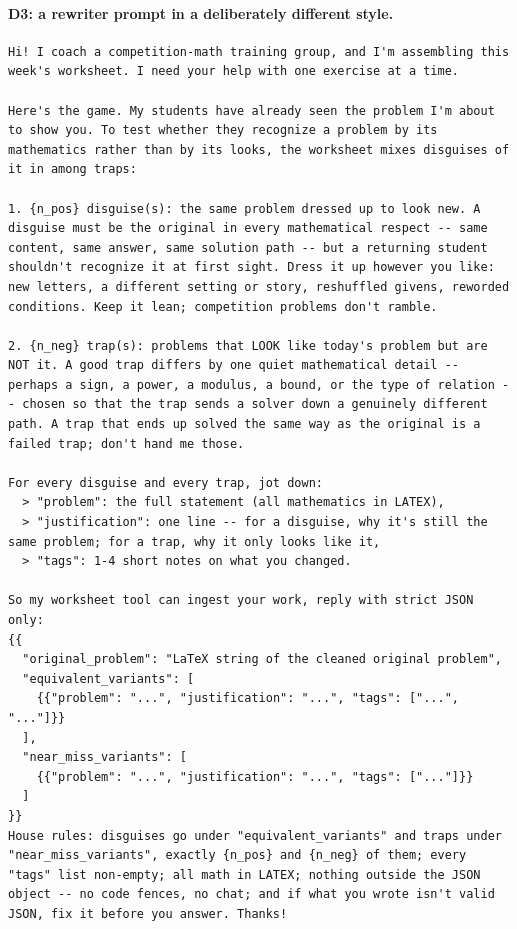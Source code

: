 \paragraph{D3: a rewriter prompt in a deliberately different style.}
\begin{Verbatim}[breaklines=true,breakanywhere=true,fontsize=\small]
Hi! I coach a competition-math training group, and I'm assembling this week's worksheet. I need your help with one exercise at a time.

Here's the game. My students have already seen the problem I'm about to show you. To test whether they recognize a problem by its mathematics rather than by its looks, the worksheet mixes disguises of it in among traps:

1. {n_pos} disguise(s): the same problem dressed up to look new. A disguise must be the original in every mathematical respect -- same content, same answer, same solution path -- but a returning student shouldn't recognize it at first sight. Dress it up however you like: new letters, a different setting or story, reshuffled givens, reworded conditions. Keep it lean; competition problems don't ramble.

2. {n_neg} trap(s): problems that LOOK like today's problem but are NOT it. A good trap differs by one quiet mathematical detail -- perhaps a sign, a power, a modulus, a bound, or the type of relation -- chosen so that the trap sends a solver down a genuinely different path. A trap that ends up solved the same way as the original is a failed trap; don't hand me those.

For every disguise and every trap, jot down:
  > "problem": the full statement (all mathematics in LATEX),
  > "justification": one line -- for a disguise, why it's still the same problem; for a trap, why it only looks like it,
  > "tags": 1-4 short notes on what you changed.

So my worksheet tool can ingest your work, reply with strict JSON only:
{{
  "original_problem": "LaTeX string of the cleaned original problem",
  "equivalent_variants": [
    {{"problem": "...", "justification": "...", "tags": ["...", "..."]}}
  ],
  "near_miss_variants": [
    {{"problem": "...", "justification": "...", "tags": ["..."]}}
  ]
}}
House rules: disguises go under "equivalent_variants" and traps under "near_miss_variants", exactly {n_pos} and {n_neg} of them; every "tags" list non-empty; all math in LATEX; nothing outside the JSON object -- no code fences, no chat; and if what you wrote isn't valid JSON, fix it before you answer. Thanks!
\end{Verbatim}

